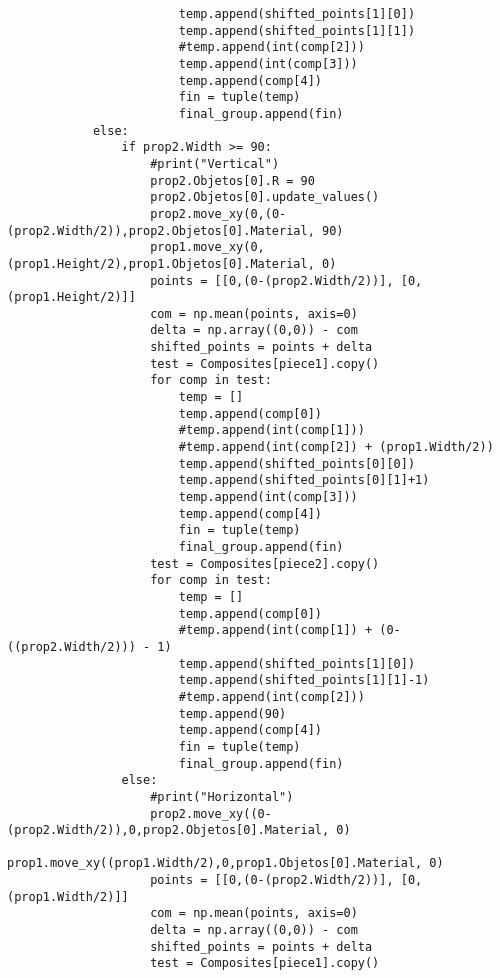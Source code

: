 \begin{verbatim}
                        temp.append(shifted_points[1][0])
                        temp.append(shifted_points[1][1])
                        #temp.append(int(comp[2]))
                        temp.append(int(comp[3]))
                        temp.append(comp[4])
                        fin = tuple(temp)
                        final_group.append(fin)
            else:
                if prop2.Width >= 90:
                    #print("Vertical")
                    prop2.Objetos[0].R = 90
                    prop2.Objetos[0].update_values()
                    prop2.move_xy(0,(0-(prop2.Width/2)),prop2.Objetos[0].Material, 90)
                    prop1.move_xy(0,(prop1.Height/2),prop1.Objetos[0].Material, 0)
                    points = [[0,(0-(prop2.Width/2))], [0,(prop1.Height/2)]]
                    com = np.mean(points, axis=0)
                    delta = np.array((0,0)) - com
                    shifted_points = points + delta
                    test = Composites[piece1].copy()
                    for comp in test:
                        temp = []
                        temp.append(comp[0])
                        #temp.append(int(comp[1]))
                        #temp.append(int(comp[2]) + (prop1.Width/2))
                        temp.append(shifted_points[0][0])
                        temp.append(shifted_points[0][1]+1)
                        temp.append(int(comp[3]))
                        temp.append(comp[4])
                        fin = tuple(temp)
                        final_group.append(fin)
                    test = Composites[piece2].copy()
                    for comp in test:
                        temp = []
                        temp.append(comp[0])
                        #temp.append(int(comp[1]) + (0-((prop2.Width/2))) - 1)
                        temp.append(shifted_points[1][0])
                        temp.append(shifted_points[1][1]-1)
                        #temp.append(int(comp[2]))
                        temp.append(90)
                        temp.append(comp[4])
                        fin = tuple(temp)
                        final_group.append(fin)
                else:
                    #print("Horizontal")
                    prop2.move_xy((0-(prop2.Width/2)),0,prop2.Objetos[0].Material, 0)
                    prop1.move_xy((prop1.Width/2),0,prop1.Objetos[0].Material, 0)
                    points = [[0,(0-(prop2.Width/2))], [0,(prop1.Width/2)]]
                    com = np.mean(points, axis=0)
                    delta = np.array((0,0)) - com
                    shifted_points = points + delta
                    test = Composites[piece1].copy()

\end{verbatim}
